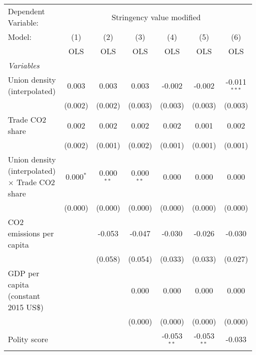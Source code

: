 
\begingroup
\centering
\begin{tabular}{lcccccc}
   \toprule
   Dependent Variable: & \multicolumn{6}{c}{Stringency value modified}\\
   Model:                                                 & (1)         & (2)          & (3)          & (4)           & (5)           & (6)\\  
                                                          &  OLS        & OLS          & OLS          & OLS           & OLS           & OLS\\  
   \midrule
   \emph{Variables}\\
   Union density (interpolated)                           & 0.003       & 0.003        & 0.003        & -0.002        & -0.002        & -0.011$^{***}$\\   
                                                          & (0.002)     & (0.002)      & (0.003)      & (0.003)       & (0.003)       & (0.003)\\   
   Trade CO2 share                                        & 0.002       & 0.002        & 0.002        & 0.002         & 0.001         & 0.002\\   
                                                          & (0.002)     & (0.001)      & (0.002)      & (0.001)       & (0.001)       & (0.001)\\   
   Union density (interpolated) $\times$ Trade CO2 share  & 0.000$^{*}$ & 0.000$^{**}$ & 0.000$^{**}$ & 0.000         & 0.000         & 0.000\\   
                                                          & (0.000)     & (0.000)      & (0.000)      & (0.000)       & (0.000)       & (0.000)\\   
   CO2 emissions per capita                               &             & -0.053       & -0.047       & -0.030        & -0.026        & -0.030\\   
                                                          &             & (0.058)      & (0.054)      & (0.033)       & (0.033)       & (0.027)\\   
   GDP per capita (constant 2015 US\$)                    &             &              & 0.000        & 0.000         & 0.000         & 0.000\\   
                                                          &             &              & (0.000)      & (0.000)       & (0.000)       & (0.000)\\   
   Polity score                                           &             &              &              & -0.053$^{**}$ & -0.053$^{**}$ & -0.033\\   

\end{tabular}
